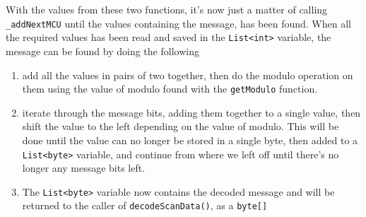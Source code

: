 With the values from these two functions, it's now just a matter of calling \lstinline|_addNextMCU| until the values containing the message, has been found.
When all the required values has been read and saved in the \lstinline|List<int>| variable, the message can be found by doing the following
\begin{enumerate}
	\item add all the values in pairs of two together, then do the modulo operation on them using the value of modulo found with the \lstinline|getModulo| function.
	\item iterate through the message bits, adding them together to a single value, then shift the value to the left depending on the value of modulo.
	This will be done until the value can no longer be stored in a single byte, then added to a \lstinline|List<byte>| variable, and continue from where we left off until there's no longer any message bits left.
	\item The \lstinline|List<byte>| variable now contains the decoded message and will be returned to the caller of \lstinline|decodeScanData()|, as a \lstinline|byte[]|
\end{enumerate}
